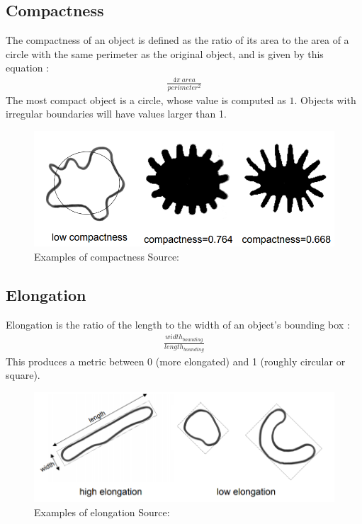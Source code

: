 \documentclass[letterpaper]{article}
\begin{document}
{\subsection{Compactness}
The compactness of an object is defined as the ratio of its area to the area of a circle with the same perimeter as the original object, and is given by this equation \cite{Wirth2004-li}:
\begin{eqnarray*}
\frac {4 \pi\ area} {perimeter^2}
\end{eqnarray*} 
The most compact object is a circle, whose value is computed as $1$.  Objects with irregular boundaries will have values larger than 1.
\begin{figure}[H]
	\centering
	\includegraphics[width=0.4\linewidth]{./figures/compactness.png}
	\caption{Examples of compactness Source:~\cite{Wirth2004-l}}
	\label{fig:compactness}
\end{figure}

\subsection{Elongation}
Elongation is the ratio of the length to the width of an object's bounding box \cite{Wirth2004-li}:
\begin{eqnarray*}
\frac {width_{bounding}} {length_{bounding}}
\end{eqnarray*}
This produces a metric between 0 (more elongated) and 1 (roughly circular or square).
\begin{figure}[H]
	\centering
	\includegraphics[width=0.4\linewidth]{./figures/elongation.png}
	\caption{Examples of elongation Source: \cite{Wirth2004-l} }
	\label{fig:elongation}
\end{figure}
}
\end{document}
